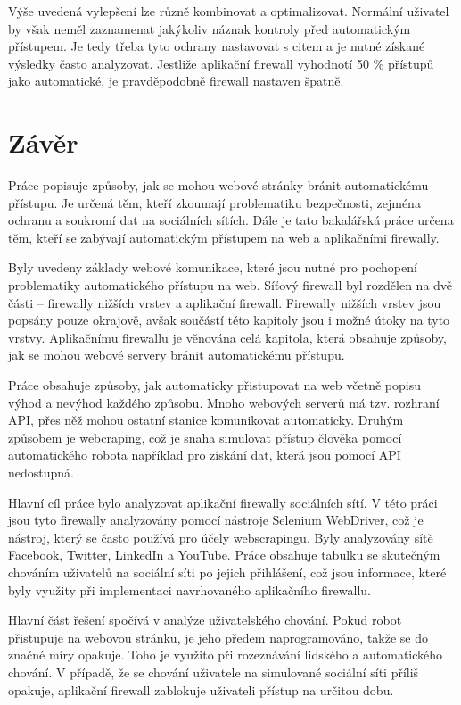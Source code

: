 Výše uvedená vylepšení lze různě kombinovat a optimalizovat. Normální uživatel by však neměl zaznamenat jakýkoliv náznak kontroly před automatickým přístupem. Je tedy třeba tyto ochrany nastavovat s citem a je nutné získané výsledky často analyzovat. Jestliže aplikační firewall vyhodnotí 50 \% přístupů jako automatické, je pravděpodobně firewall nastaven špatně.

\chapter{Závěr}
Práce popisuje způsoby, jak se mohou webové stránky bránit automatickému přístupu. Je určená těm, kteří zkoumají problematiku bezpečnosti, zejména ochranu a soukromí dat na sociálních sítích. Dále je tato bakalářská práce určena těm, kteří se zabývají automatickým přístupem na web a aplikačními firewally.

Byly uvedeny základy webové komunikace, které jsou nutné pro pochopení problematiky automatického přístupu na web. Síťový firewall byl rozdělen na dvě části -- firewally nižších vrstev a aplikační firewall. Firewally nižších vrstev jsou popsány pouze okrajově, avšak součástí této kapitoly jsou i možné útoky na tyto vrstvy. Aplikačnímu firewallu je věnována celá kapitola, která obsahuje způsoby, jak se mohou webové servery bránit automatickému přístupu.

Práce obsahuje způsoby, jak automaticky přistupovat na web včetně popisu výhod a nevýhod každého způsobu. Mnoho webových serverů má tzv. rozhraní API, přes něž mohou ostatní stanice komunikovat automaticky. Druhým způsobem je webcraping, což je snaha simulovat přístup člověka pomocí automatického robota například pro získání dat, která jsou pomocí API nedostupná.

Hlavní cíl práce bylo analyzovat aplikační firewally sociálních sítí. V této práci jsou tyto firewally analyzovány pomocí nástroje Selenium WebDriver, což je nástroj, který se často používá pro účely webscrapingu. Byly analyzovány sítě Facebook, Twitter, LinkedIn a YouTube. Práce obsahuje tabulku se skutečným chováním uživatelů na sociální síti po jejich přihlášení, což jsou informace, které byly využity při implementaci navrhovaného aplikačního firewallu.

Hlavní část řešení spočívá v analýze uživatelského chování. Pokud robot přistupuje na webovou stránku, je jeho předem naprogramováno, takže se do značné míry opakuje. Toho je využito při rozeznávání lidského a automatického chování. V případě, že se chování uživatele na simulované sociální síti příliš opakuje, aplikační firewall zablokuje uživateli přístup na určitou dobu.

